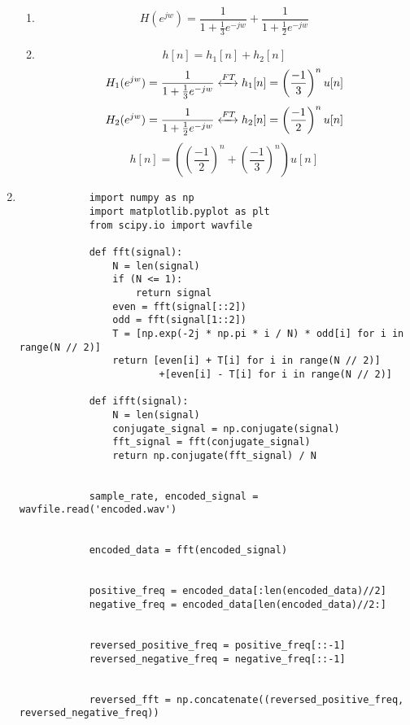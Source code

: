 \documentclass[10pt,a4paper, margin=1in]{article}
\begin{document}
\begin{enumerate}
\begin{enumerate}
    \item %
        \[ H(e^{jw}) = \frac{1}{1+\frac{1}{3}e^{-jw}} + \frac{1}{1+\frac{1}{2}e^{-jw}}\]
        
    \item %
        \[ h[n] = h_1[n] + h_2[n]\]
        \[ H_1(e^{jw}) = \frac{1}{1+\frac{1}{3}e^{-jw}} \xleftrightarrow{FT} h_1[n] = \left( \frac{-1}{3}\right)^n u[n] \]
        \[ H_2(e^{jw}) = \frac{1}{1+\frac{1}{2}e^{-jw}} \xleftrightarrow{FT} h_2[n] = \left( \frac{-1}{2}\right)^n u[n] \]
        \[ h[n] = \left( \left( \frac{-1}{2}\right)^n + \left( \frac{-1}{3}\right)^n \right) u[n]\]
\end{enumerate}

\newpage
\item %
    \begin{enumerate}
         \begin{verbatim}
            import numpy as np
            import matplotlib.pyplot as plt
            from scipy.io import wavfile
            
            def fft(signal):
                N = len(signal)
                if (N <= 1):
                    return signal
                even = fft(signal[::2])
                odd = fft(signal[1::2])
                T = [np.exp(-2j * np.pi * i / N) * odd[i] for i in range(N // 2)]
                return [even[i] + T[i] for i in range(N // 2)] 
                        +[even[i] - T[i] for i in range(N // 2)]
            
            def ifft(signal):
                N = len(signal)
                conjugate_signal = np.conjugate(signal)
                fft_signal = fft(conjugate_signal)
                return np.conjugate(fft_signal) / N
            
            
            sample_rate, encoded_signal = wavfile.read('encoded.wav')
            
            
            encoded_data = fft(encoded_signal)
            
            
            positive_freq = encoded_data[:len(encoded_data)//2]
            negative_freq = encoded_data[len(encoded_data)//2:]
            
            
            reversed_positive_freq = positive_freq[::-1]
            reversed_negative_freq = negative_freq[::-1]
            
            
            reversed_fft = np.concatenate((reversed_positive_freq, reversed_negative_freq))
            

\end{verbatim}
\end{enumerate}
\end{enumerate}
\end{document}
